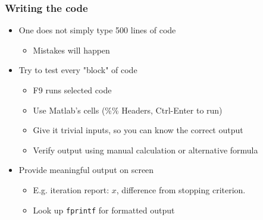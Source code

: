 \documentclass[bigger]{beamer}
\begin{document}
\begin{frame}
\frametitle{Writing the code}

\begin{itemize}
\item One does not simply type 500 lines of code

\begin{itemize}
\item Mistakes will happen
\end{itemize}

\item Try to test every "block" of code

\begin{itemize}
\item F9 runs selected code

\item Use Matlab's cells (\%\% Headers, Ctrl-Enter to run)

\item Give it trivial inputs, so you can know the correct output

\item Verify output using manual calculation or alternative formula
\end{itemize}

\item Provide meaningful output on screen

\begin{itemize}
\item E.g. iteration report: $x$, difference from stopping criterion.

\item Look up \texttt{fprintf} for formatted output
\end{itemize}
\end{itemize}

\end{frame}
\end{document}
